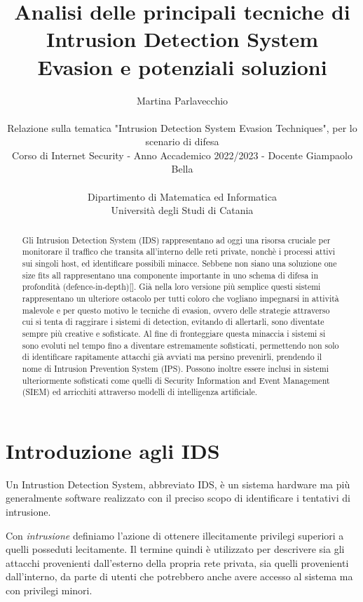\documentclass{ldr-article}
\title{Analisi delle principali tecniche di Intrusion Detection System Evasion e potenziali soluzioni }
\author{
Martina Parlavecchio
\\\\
Relazione sulla tematica "Intrusion Detection System Evasion Techniques", per lo scenario di difesa \\
Corso di Internet Security - Anno Accademico 2022/2023 - Docente Giampaolo Bella \\\\
Dipartimento di Matematica ed Informatica \\
Università degli Studi di Catania
}
\begin{document}
    \maketitle

    \begin{abstract}
        Gli Intrusion Detection System (IDS) rappresentano ad oggi una risorsa cruciale per monitorare il traffico che transita all'interno delle reti private, nonchè i processi attivi sui singoli host, ed identificare possibili minacce. Sebbene non siano una soluzione one size fits all rappresentano una componente importante in uno schema di difesa in profondità (defence-in-depth)[\cite{defence-in-depth}]. Già nella loro versione più semplice questi sistemi rappresentano un ulteriore ostacolo per tutti coloro che vogliano impegnarsi in attività malevole e per questo motivo le tecniche di evasion, ovvero delle strategie attraverso cui si tenta di raggirare i sistemi di detection, evitando di allertarli, sono diventate sempre più creative e sofisticate. Al fine di fronteggiare questa minaccia i sistemi si sono evoluti nel tempo fino a diventare estremamente sofisticati, permettendo non solo di identificare rapitamente attacchi già avviati ma persino prevenirli, prendendo il nome di Intrusion Prevention System (IPS). Possono inoltre essere inclusi in sistemi ulteriormente sofisticati come quelli di Security Information and Event Management (SIEM) ed arricchiti attraverso modelli di intelligenza artificiale.
    \end{abstract}
    
    \pagebreak

    \tableofcontents
    \mainmatter

    \pagebreak
    

\section{Introduzione agli IDS}

Un Intrustion Detection System, abbreviato IDS, è un sistema hardware ma più generalmente software realizzato con il preciso scopo di identificare i tentativi di intrusione.

Con \textit{intrusione} definiamo l'azione di ottenere illecitamente privilegi superiori a quelli posseduti lecitamente. Il termine quindi è utilizzato per descrivere sia gli attacchi provenienti dall'esterno della propria rete privata, sia quelli provenienti dall'interno, da parte di utenti che potrebbero anche avere accesso al sistema ma con privilegi minori.
\end{document}
